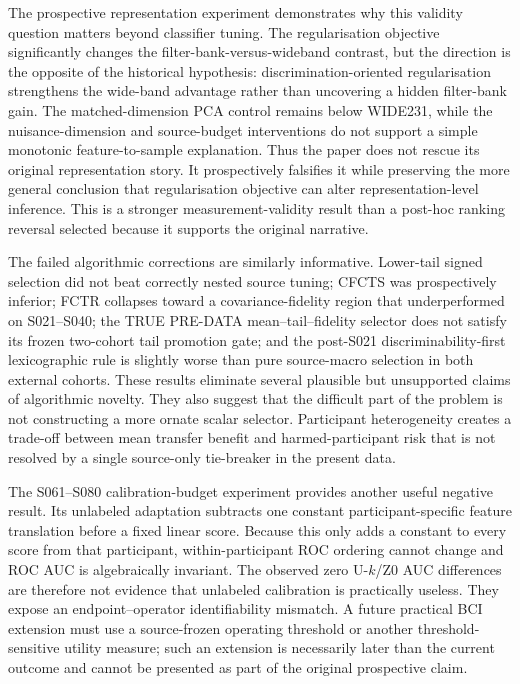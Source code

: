 The prospective representation experiment demonstrates why this validity
question matters beyond classifier tuning. The regularisation objective
significantly changes the filter-bank-versus-wideband contrast, but the
direction is the opposite of the historical hypothesis:
discrimination-oriented regularisation strengthens the wide-band advantage
rather than uncovering a hidden filter-bank gain. The matched-dimension PCA
control remains below WIDE231, while the nuisance-dimension and source-budget
interventions do not support a simple monotonic feature-to-sample explanation.
Thus the paper does not rescue its original representation story. It
prospectively falsifies it while preserving the more general conclusion that
regularisation objective can alter representation-level inference. This is a
stronger measurement-validity result than a post-hoc ranking reversal selected
because it supports the original narrative.

The failed algorithmic corrections are similarly informative. Lower-tail
signed selection did not beat correctly nested source tuning; CFCTS was
prospectively inferior; FCTR collapses toward a covariance-fidelity region
that underperformed on S021--S040; the TRUE PRE-DATA mean--tail--fidelity
selector does not satisfy its frozen two-cohort tail promotion gate; and the
post-S021 discriminability-first lexicographic rule is slightly worse than
pure source-macro selection in both external cohorts. These results eliminate
several plausible but unsupported claims of algorithmic novelty. They also
suggest that the difficult part of the problem is not constructing a more
ornate scalar selector. Participant heterogeneity creates a trade-off between
mean transfer benefit and harmed-participant risk that is not resolved by a
single source-only tie-breaker in the present data.

The S061--S080 calibration-budget experiment provides another useful
negative result. Its unlabeled adaptation subtracts one constant
participant-specific feature translation before a fixed linear score.
Because this only adds a constant to every score from that participant,
within-participant ROC ordering cannot change and ROC AUC is algebraically
invariant. The observed zero U-\(k\)/Z0 AUC differences are therefore not
evidence that unlabeled calibration is practically useless. They expose an
endpoint--operator identifiability mismatch. A future practical BCI extension
must use a source-frozen operating threshold or another threshold-sensitive
utility measure; such an extension is necessarily later than the current
outcome and cannot be presented as part of the original prospective claim.

